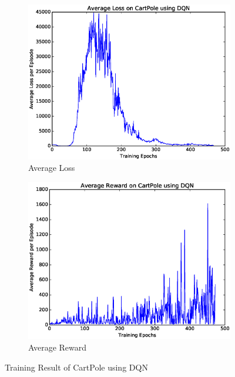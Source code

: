 \documentclass[a4paper,UTF8]{article}
\theoremstyle{definition}
\begin{document}
\begin{figure}[htbp]
	\centering
	\begin{subfigure}[t]{0.5\textwidth}
		\centering
		\includegraphics[scale=0.35]{figures/pole-dqn-loss}
		\caption{Average Loss}
	\end{subfigure}%
	\begin{subfigure}[t]{0.5\textwidth}
		\centering
		\includegraphics[scale=0.35]{figures/pole-dqn-reward}
		\caption{Average Reward}
	\end{subfigure}
	\caption{Training Result of CartPole using DQN}\label{fig:pole-dqn}
\end{figure}
\end{document}
